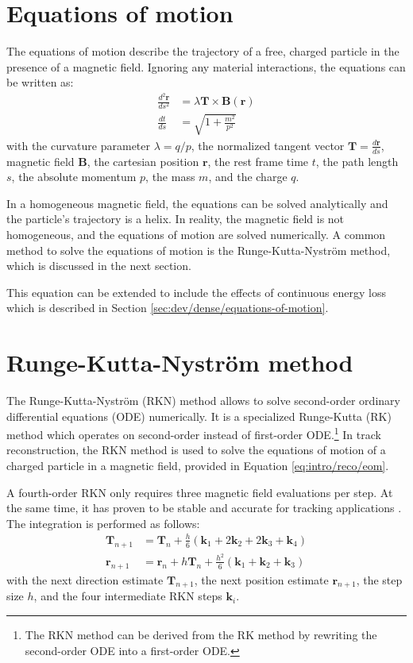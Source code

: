 \section{Equations of motion}
\label{sec:into/reco/equations-of-motion}

The equations of motion describe the trajectory of a free, charged particle in the presence of a magnetic field. Ignoring any material interactions, the equations can be written as:
\begin{align}
    \label{eq:intro/reco/eom}
    \frac{d^2\mathbf{r}}{ds^2} &= \lambda \mathbf{T} \times \mathbf{B}(\mathbf{r}) \\
    \frac{dt}{ds} &= \sqrt{1 + \frac{m^2}{p^2}}
\end{align}
with the curvature parameter $\lambda = q / p$, the normalized tangent vector $\mathbf{T} =\frac{d\mathbf{r}}{ds}$, magnetic field $\mathbf{B}$, the cartesian position $\mathbf{r}$, the rest frame time $t$, the path length $s$, the absolute momentum $p$, the mass $m$, and the charge $q$.

In a homogeneous magnetic field, the equations can be solved analytically and the particle's trajectory is a helix. In reality, the magnetic field is not homogeneous, and the equations of motion are solved numerically. A common method to solve the equations of motion is the Runge-Kutta-Nyström method, which is discussed in the next section.

This equation can be extended to include the effects of continuous energy loss which is described in Section \ref{sec:dev/dense/equations-of-motion}.

\section{Runge-Kutta-Nyström method}
\label{sec:into/reco/runge-kutta-nystrom}

The Runge-Kutta-Nyström (RKN) method allows to solve second-order ordinary differential equations (ODE) numerically. It is a specialized Runge-Kutta (RK) method which operates on second-order instead of first-order ODE.\footnote{The RKN method can be derived from the RK method by rewriting the second-order ODE into a first-order ODE.} In track reconstruction, the RKN method is used to solve the equations of motion of a charged particle in a magnetic field, provided in Equation \ref{eq:intro/reco/eom}.

A fourth-order RKN only requires three magnetic field evaluations per step. At the same time, it has proven to be stable and accurate for tracking applications \cite{pub-2009-001}. The integration is performed as follows:
\begin{align}
    \mathbf{T}_{n+1} &= \mathbf{T}_n + \frac{h}{6} (\mathbf{k}_1 + 2 \mathbf{k}_2 + 2 \mathbf{k}_3 + \mathbf{k}_4) \\
    \mathbf{r}_{n+1} &= \mathbf{r}_n + h \mathbf{T}_n + \frac{h^2}{6} (\mathbf{k}_1 + \mathbf{k}_2 + \mathbf{k}_3)
    \label{eq:intro/reco/rkn}
\end{align}
with the next direction estimate $\mathbf{T}_{n+1}$, the next position estimate $\mathbf{r}_{n+1}$, the step size $h$, and the four intermediate RKN steps $\mathbf{k}_i$.

